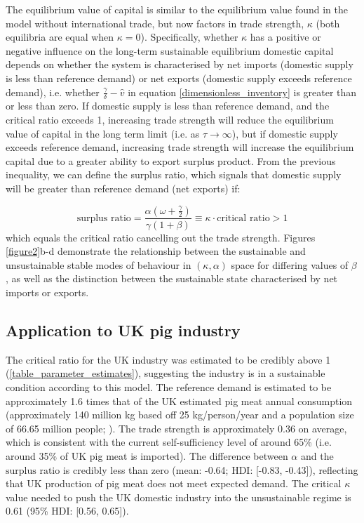 \documentclass[12pt]{article}
\begin{document}
The equilibrium value of capital is similar to the equilibrium value found in the model without international trade, but now factors in trade strength, $\kappa$ (both equilibria are equal when $\kappa = 0$). Specifically, whether $\kappa$ has a positive or negative influence on the long-term sustainable equilibrium domestic capital depends on whether the system is characterised by net imports (domestic supply is less than reference demand) or net exports (domestic supply exceeds reference demand), i.e. whether $\frac{\gamma}{\delta} - \hat{v}$ in equation \ref{dimensionless_inventory} is greater than or less than zero. If domestic supply is less than reference demand, and the critical ratio exceeds 1, increasing trade strength will reduce the equilibrium value of capital in the long term limit (i.e. as $\tau \rightarrow \infty$), but if domestic supply exceeds reference demand, increasing trade strength will increase the equilibrium capital due to a greater ability to export surplus product. From the previous inequality, we can define the surplus ratio, which signals that domestic supply will be greater than reference demand (net exports) if:

\begin{equation}
  \text{surplus ratio} = \frac{\alpha (\omega + \frac{\gamma}{2})}{\gamma (1 + \beta)} \equiv \kappa \cdot \text{critical ratio} > 1
\end{equation}
%
which equals the critical ratio cancelling out the trade strength. Figures \ref{figure2}b-d demonstrate the relationship between the sustainable and unsustainable stable modes of behaviour in $(\kappa, \alpha)$ space for differing values of $\beta$, as well as the distinction between the sustainable state characterised by net imports or exports.

\subsection{Application to UK pig industry}
The critical ratio for the UK industry was estimated to be credibly above 1 (\ref{table_parameter_estimates}), suggesting the industry is in a sustainable condition according to this model. The reference demand is estimated to be approximately 1.6 times that of the UK estimated pig meat annual consumption (approximately 140 million kg based off 25 kg/person/year and a population size of 66.65 million people; \cite{AHDBpocketbook2018}). The trade strength is approximately 0.36 on average, which is consistent with the current self-sufficiency level of around 65\% (i.e. around 35\% of UK pig meat is imported). The difference between $\alpha$ and the $\text{surplus ratio}$ is credibly less than zero (mean: -0.64; HDI: [-0.83, -0.43]), reflecting that UK production of pig meat does not meet expected demand. The critical $\kappa$ value needed to push the UK domestic industry into the unsustainable regime is 0.61 (95\% HDI: [0.56, 0.65]).
\end{document}
